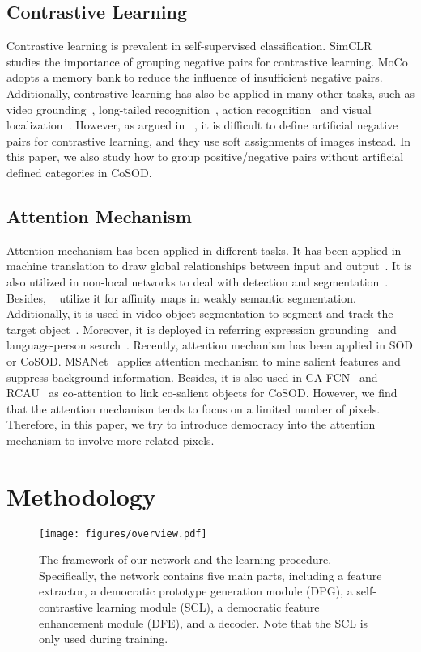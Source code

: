 \documentclass[10pt,twocolumn,letterpaper]{article}
\begin{document}
\subsection{Contrastive Learning}
Contrastive learning is prevalent in self-supervised classification. SimCLR~\cite{chen2020simple} studies the importance of grouping negative pairs for contrastive learning. MoCo~\cite{he2020momentum} adopts a memory bank to reduce the influence of insufficient negative pairs. Additionally, contrastive learning has also be applied in many other tasks, such as video grounding~\cite{nan2021interventional}, long-tailed recognition~\cite{cui2021parametric}, action recognition~\cite{singh2021semi} and visual localization~\cite{thoma2020soft}. However, as argued in ~\cite{thoma2020soft}, it is difficult to define artificial negative pairs for contrastive learning, and they use soft assignments of images instead. In this paper, we also study how to group positive/negative pairs without artificial defined categories in CoSOD.

\subsection{Attention Mechanism}
Attention mechanism has been applied in different tasks. It has been applied in machine translation to draw global relationships between input and output~\cite{vaswani2017attention}. It is also utilized in non-local networks to deal with detection and segmentation~\cite{wang2018non, fu2019dual, wang2020few}. Besides, ~\cite{zhang2021affinity} utilize it for affinity maps in weakly semantic segmentation. Additionally, it is used in video object segmentation to segment and track the target object~\cite{oh2019video,yu2021fast}. Moreover, it is deployed in referring expression grounding~\cite{sun2021discriminative} and language-person search~\cite{9406055}. Recently, attention mechanism has been applied in SOD or CoSOD.  
MSANet~\cite{zhou2020multi} applies attention mechanism to mine salient features and suppress background information. Besides, it is also used in CA-FCN~\cite{gao2020co} and RCAU~\cite{li2019detecting} as co-attention to link co-salient objects for CoSOD. However, we find that the attention mechanism tends to focus on a limited number of pixels. Therefore, in this paper, we try to introduce democracy into the attention mechanism to involve more related pixels.

\section{Methodology}
\begin{figure*}
	\centering
	\texttt{[image: figures/overview.pdf]}
	\caption{The framework of our network and the learning procedure. Specifically, the network contains five main parts, including a feature extractor, a democratic prototype generation module (DPG), a self-contrastive learning module (SCL), a democratic feature enhancement module (DFE), and a decoder. Note that the SCL is only used during training.}
	\label{FIG:overview}
\end{figure*}
\end{document}
